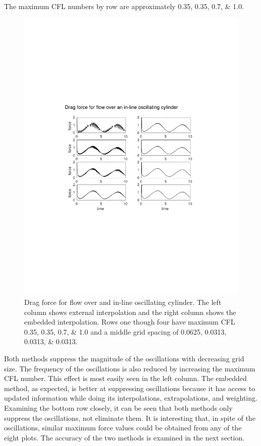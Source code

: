 The maximum CFL numbers by row are approximately \numlist{0.35; 0.35; 0.7; 1.0}.
\begin{figure}[!htb]
	\centering
	\includegraphics[width=\textwidth]{cropped_oscflow}
	\caption{Drag force for flow over and in-line oscillating cylinder. The left column shows external interpolation and the right column shows the embedded interpolation. Rows one though four have maximum CFL \numlist{0.35; 0.35; 0.7; 1.0} and a middle grid spacing of \numlist{0.0625; 0.0313; 0.0313; 0.0313}.}
	\label{fig:osccylinder}
\end{figure}

Both methods suppress the magnitude of the oscillations with decreasing grid size. 
The frequency of the oscillations is also reduced by increasing the maximum CFL number. 
This effect is most easily seen in the left column. 
The embedded method, as expected, is better at suppressing oscillations because it has access to updated information while doing its interpolations, extrapolations, and weighting.  
Examining the bottom row closely, it can be seen that both methods only suppress the oscillations, not eliminate them. 
It is interesting that, in spite of the oscillations, similar maximum force values could be obtained from any of the eight plots. 
The accuracy of the two methods is examined in the next section. 

